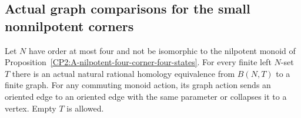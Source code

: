 \subsection{Actual graph comparisons for the small nonnilpotent corners}

\begin{lemma}
\label{CP2:A-four-corner-actual-graph}
Let $N$ have order at most four and not be isomorphic to the
nilpotent monoid of Proposition~\ref{CP2:A-nilpotent-four-corner-four-states}.
For every finite left $N$-set $T$ there is an actual natural
rational homology equivalence from $B(N,T)$ to a finite graph.
For any commuting monoid action, its graph action sends an
oriented edge to an oriented edge with the same parameter or
collapses it to a vertex. Empty $T$ is allowed.
\end{lemma}
